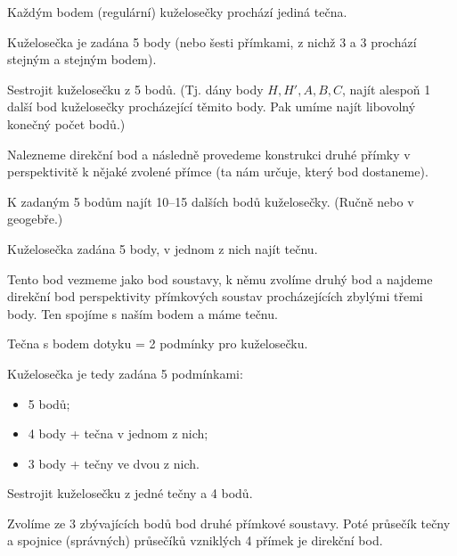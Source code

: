 \documentclass[12pt]{article}					%
\begin{document}
\begin{dusledek}
	Každým bodem (regulární) kuželosečky prochází jediná tečna.
\end{dusledek}

\begin{dusledek}
	Kuželosečka je zadána 5 body (nebo šesti přímkami, z nichž 3 a 3 prochází stejným a stejným bodem).
\end{dusledek}


\begin{priklad}[Konstrukce (!!!)]
	Sestrojit kuželosečku z 5 bodů. (Tj. dány body $H, H', A, B, C$, najít alespoň 1 další bod kuželosečky procházející těmito body. Pak umíme najít libovolný konečný počet bodů.)

	\begin{reseni}
		Nalezneme direkční bod a následně provedeme konstrukci druhé přímky v perspektivitě k nějaké zvolené přímce (ta nám určuje, který bod dostaneme).
	\end{reseni}
\end{priklad}

\begin{priklad}[DÚ]
	K zadaným 5 bodům najít 10–15 dalších bodů kuželosečky. (Ručně nebo v geogebře.)
\end{priklad}

\begin{priklad}[Konstrukce]
	Kuželosečka zadána 5 body, v jednom z nich najít tečnu.

	\begin{reseni}
		Tento bod vezmeme jako bod soustavy, k němu zvolíme druhý bod a najdeme direkční bod perspektivity přímkových soustav procházejících zbylými třemi body. Ten spojíme s naším bodem a máme tečnu.
	\end{reseni}
\end{priklad}

\begin{poznamka}
	Tečna s bodem dotyku = 2 podmínky pro kuželosečku.

	Kuželosečka je tedy zadána 5 podmínkami:
	\begin{itemize}
		\item 5 bodů;
		\item 4 body + tečna v jednom z nich;
		\item 3 body + tečny ve dvou z nich.
	\end{itemize}
\end{poznamka}

\begin{priklad}[Konstrukce]
	Sestrojit kuželosečku z jedné tečny a 4 bodů.

	\begin{reseni}
		Zvolíme ze 3 zbývajících bodů bod druhé přímkové soustavy. Poté průsečík tečny a spojnice (správných) průsečíků vzniklých 4 přímek je direkční bod.
	\end{reseni}
\end{priklad}
\end{document}
